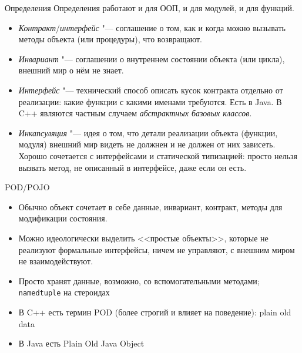 \begin{frame}[t]{Определения}
Определения работают и для ООП, и для модулей, и для функций.

\begin{itemize}
\item
	\textit{Контракт}/\textit{интерфейс} "--- соглашение о том, как
	и когда можно вызывать методы объекта (или процедуры), что возвращают.
\item
	\textit{Инвариант} "--- соглашении о внутреннем состоянии объекта
	(или цикла), внешний мир о нём не знает.
\item
	\textit{Интерфейс} "--- технический способ описать кусок контракта
	отдельно от реализации: какие функции с какими именами требуются.
	Есть в Java.
	В C++ являются частным случаем \textit{абстрактных базовых классов}.
\item
	\textit{Инкапсуляция} "--- идея о том, что детали реализации объекта
	(функции, модуля) внешний мир видеть не должнен и не должен от них
	зависеть.
	Хорошо сочетается с интерфейсами и статической типизацией:
	просто нельзя вызвать метод, не описанный в интерфейсе, даже если он есть.
\end{itemize}
\end{frame}

\begin{frame}[t,fragile]{POD/POJO}
\begin{itemize}
\item
	Обычно объект сочетает в себе данные, инвариант, контракт, методы для модификации состояния.
\item
	Можно идеологически выделить <<простые объекты>>, которые не реализуют формальные интерфейсы,
	ничем не управляют, с внешним миром не взаимодействуют.
\item
	Просто хранят данные, возможно, со вспомогательными методами;
	\verb`namedtuple` на стероидах
\item
	В C++ есть термин POD (более строгий и влияет на поведение): plain old data
\item
	В Java есть Plain Old Java Object
\end{itemize}
\end{frame}

